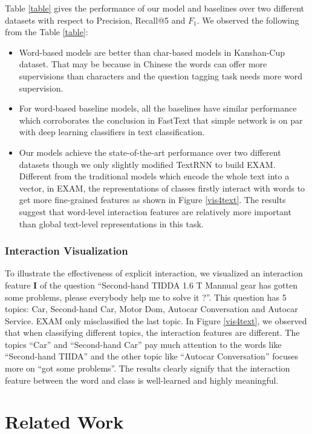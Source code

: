 \documentclass[letterpaper]{article} %
\begin{document}
Table \ref{table} gives the performance of our model and baselines over two different datasets with respect to Precision, Recall@5 and $F_{1}$. We observed the following from the Table \ref{table}:
\begin{itemize}
\item Word-based models are better than char-based models in Kanshan-Cup dataset. That may be because in Chinese the words can offer more supervisions than characters and the question tagging task needs more word supervision.
\item  For word-based baseline models, all the baselines have similar performance which corroborates the conclusion in FastText \cite{fasttext} that simple network is on par with deep learning classifiers in text classification.
\item Our models achieve the state-of-the-art performance over two different datasets though we only slightly modified TextRNN to build EXAM. Different from the traditional models which encode the whole text into a vector, in EXAM, the representations of classes firstly interact with  words to get more fine-grained features as shown in Figure \ref{vis4text}. The results suggest that word-level interaction features are relatively more important than global text-level representations in this task.
\end{itemize}


\subsubsection{Interaction Visualization}
To illustrate the effectiveness of explicit interaction, we visualized an interaction feature \textbf{I} of the question ``Second-hand TIDDA 1.6 T Mannual gear has gotten some problems, please everybody help me to solve it ?''. This question has 5 topics: Car, Second-hand Car, Motor Dom, Autocar Conversation and Autocar Service. EXAM only misclassified the last topic. In  Figure \ref{vis4text}, we observed that  when classifying different topics, the interaction features are different. The topics ``Car'' and ``Second-hand Car'' pay much attention to the words like ``Second-hand TIIDA'' and the other topic like ``Autocar Conversation'' focuses more on  ``got some problems''. The results clearly signify that the interaction feature between the word and class is well-learned and highly meaningful.

\section{Related Work}
\end{document}
